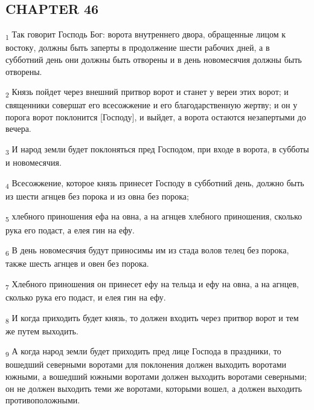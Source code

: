 \subsection{CHAPTER 46}
\begin{tcolorbox}
\textsubscript{1} Так говорит Господь Бог: ворота внутреннего двора, обращенные лицом к востоку, должны быть заперты в продолжение шести рабочих дней, а в субботний день они должны быть отворены и в день новомесячия должны быть отворены.
\end{tcolorbox}
\begin{tcolorbox}
\textsubscript{2} Князь пойдет через внешний притвор ворот и станет у вереи этих ворот; и священники совершат его всесожжение и его благодарственную жертву; и он у порога ворот поклонится [Господу], и выйдет, а ворота остаются незапертыми до вечера.
\end{tcolorbox}
\begin{tcolorbox}
\textsubscript{3} И народ земли будет поклоняться пред Господом, при входе в ворота, в субботы и новомесячия.
\end{tcolorbox}
\begin{tcolorbox}
\textsubscript{4} Всесожжение, которое князь принесет Господу в субботний день, должно быть из шести агнцев без порока и из овна без порока;
\end{tcolorbox}
\begin{tcolorbox}
\textsubscript{5} хлебного приношения ефа на овна, а на агнцев хлебного приношения, сколько рука его подаст, а елея гин на ефу.
\end{tcolorbox}
\begin{tcolorbox}
\textsubscript{6} В день новомесячия будут приносимы им из стада волов телец без порока, также шесть агнцев и овен без порока.
\end{tcolorbox}
\begin{tcolorbox}
\textsubscript{7} Хлебного приношения он принесет ефу на тельца и ефу на овна, а на агнцев, сколько рука его подаст, и елея гин на ефу.
\end{tcolorbox}
\begin{tcolorbox}
\textsubscript{8} И когда приходить будет князь, то должен входить через притвор ворот и тем же путем выходить.
\end{tcolorbox}
\begin{tcolorbox}
\textsubscript{9} А когда народ земли будет приходить пред лице Господа в праздники, то вошедший северными воротами для поклонения должен выходить воротами южными, а вошедший южными воротами должен выходить воротами северными; он не должен выходить теми же воротами, которыми вошел, а должен выходить противоположными.
\end{tcolorbox}

